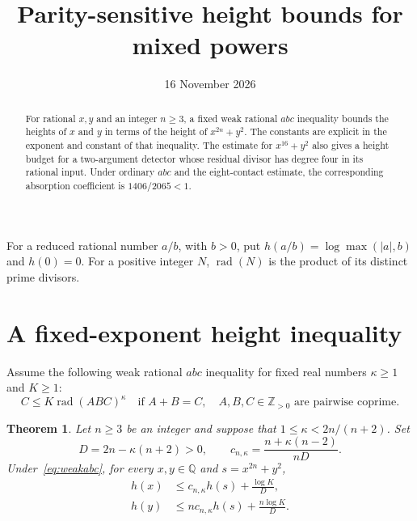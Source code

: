 \documentclass[11pt]{article}
\title{Parity-sensitive height bounds for mixed powers}
\author{}
\date{16 November 2026}
\newcommand{\Q}{\mathbb Q}
\newcommand{\Z}{\mathbb Z}
\newcommand{\rad}{\operatorname{rad}}
\newtheorem{theorem}{Theorem}
\begin{document}
\maketitle

\begin{abstract}
For rational $x,y$ and an integer $n\ge3$, a fixed weak rational
$abc$ inequality bounds the heights of $x$ and $y$ in terms of the
height of $x^{2n}+y^2$. The constants are explicit in the exponent
and constant of that inequality. The estimate for $x^{16}+y^2$
also gives a height budget for a two-argument detector whose residual
divisor has degree four in its rational input. Under ordinary $abc$
and the eight-contact estimate, the corresponding absorption coefficient
is $1406/2065<1$.
\end{abstract}

For a reduced rational number $a/b$, with $b>0$, put
$h(a/b)=\log\max(|a|,b)$ and $h(0)=0$. For a positive integer $N$,
$\rad(N)$ is the product of its distinct prime divisors.

\section{A fixed-exponent height inequality}

Assume the following weak rational $abc$ inequality for fixed real
numbers $\kappa\ge1$ and $K\ge1$:
\begin{equation}\label{eq:weakabc}
 C\le K\rad(ABC)^\kappa
 \quad\text{if }A+B=C,\quad
 A,B,C\in\Z_{>0}\text{ are pairwise coprime}.
\end{equation}

\begin{theorem}\label{thm:mixed}
Let $n\ge3$ be an integer and suppose that
$1\le\kappa<2n/(n+2)$. Set
\[
 D=2n-\kappa(n+2)>0,\qquad
 c_{n,\kappa}=\frac{n+\kappa(n-2)}{nD}.
\]
Under~\eqref{eq:weakabc}, for every $x,y\in\Q$ and
$s=x^{2n}+y^2$,
\begin{align}
 h(x)&\le c_{n,\kappa}h(s)+\frac{\log K}{D},\label{eq:xheight}\\
 h(y)&\le n c_{n,\kappa}h(s)+\frac{n\log K}{D}.
 \label{eq:yheight}
\end{align}
\end{theorem}
\end{document}
